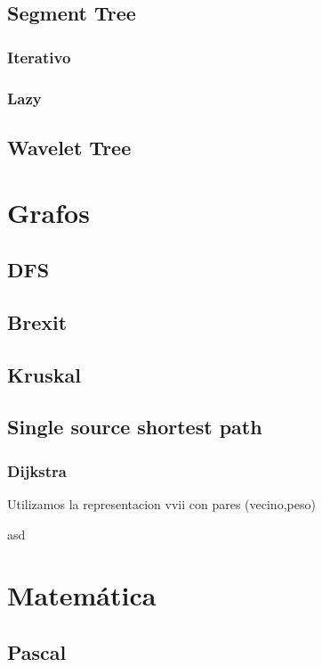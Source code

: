 \documentclass[oneside]{book}
\begin{document}
	\section{Segment Tree}
		\subsection{Iterativo}
			
		\subsection{Lazy}
			
	\section{Wavelet Tree}
		
			

	
	\chapter{Grafos}
	\section{DFS}
	
	\section{Brexit}
	
	\section{Kruskal}
	
	\section{Single source shortest path}
	\subsection{Dijkstra}
	Utilizamos la representacion vvii con pares (vecino,peso)
	\begin{codigo}
	asd
	\end{codigo}
	\chapter{Matem\'atica}
	\section{Pascal}
	
\end{document}
